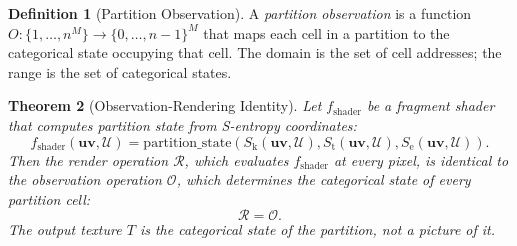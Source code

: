 \documentclass[11pt,twocolumn,a4paper]{article}
\newtheorem{theorem}{Theorem}[section]
\theoremstyle{definition}
\newtheorem{definition}[theorem]{Definition}
\theoremstyle{remark}
\newcommand{\Sk}{S_{\mathrm{k}}}
\newcommand{\St}{S_{\mathrm{t}}}
\newcommand{\Se}{S_{\mathrm{e}}}
\begin{document}
\begin{definition}[Partition Observation]
\label{def:partition_obs}
A \emph{partition observation} is a function $O: \{1, \ldots, n^M\} \to \{0, \ldots, n-1\}^M$ that maps each cell in a partition to the categorical state occupying that cell. The domain is the set of cell addresses; the range is the set of categorical states.
\end{definition}

\begin{theorem}[Observation-Rendering Identity]
\label{thm:obs_render_identity}
Let $f_{\mathrm{shader}}$ be a fragment shader that computes partition state from S-entropy coordinates:
\[
f_{\mathrm{shader}}(\mathbf{uv}, \mathcal{U}) = \text{partition\_state}(\Sk(\mathbf{uv}, \mathcal{U}), \St(\mathbf{uv}, \mathcal{U}), \Se(\mathbf{uv}, \mathcal{U})).
\]
Then the render operation $\mathcal{R}$, which evaluates $f_{\mathrm{shader}}$ at every pixel, is identical to the observation operation $\mathcal{O}$, which determines the categorical state of every partition cell:
\[
\mathcal{R} = \mathcal{O}.
\]
The output texture $T$ is the categorical state of the partition, not a picture of it.
\end{theorem}
\end{document}
